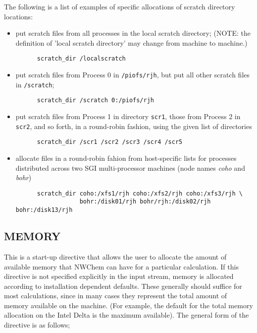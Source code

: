 The following is a list of examples of specific allocations of scratch
directory locations:
\begin{itemize}
\item put scratch files from all processes in the local scratch directory; 
(NOTE: the definition of 'local scratch directory' may change from 
machine to machine.)
\begin{verbatim}
      scratch_dir /localscratch
\end{verbatim}
\item put scratch files from Process 0 in \verb+/piofs/rjh+, but put all 
other scratch files in \verb+/scratch+;
\begin{verbatim}
      scratch_dir /scratch 0:/piofs/rjh
\end{verbatim}
\item put scratch files from Process 1 in directory \verb+scr1+, those from
Process 2 in \verb+scr2+, and so forth, in a round-robin fashion, using the
given list of directories
\begin{verbatim}
      scratch_dir /scr1 /scr2 /scr3 /scr4 /scr5
\end{verbatim}
\item allocate files in a round-robin fahion from
  host-specific lists for processes distributed across two
 SGI multi-processor machines (node names {\it coho} and {\it bohr})
\begin{verbatim}
      scratch_dir coho:/xfs1/rjh coho:/xfs2/rjh coho:/xfs3/rjh \
                  bohr:/disk01/rjh bohr/rjh:/disk02/rjh bohr:/disk13/rjh
\end{verbatim}
\end{itemize}

\subsection{MEMORY}


This is a start-up directive that allows the user to allocate the amount
of available memory that NWChem can have for a particular calculation.
If this directive is not specified explicitly in the input stream, memory
is allocated according to installation
dependent defaults.  These generally should suffice for most calculations,
since in many cases they represent the total amount of memory available on
the machine.  (For example, the default for the total memory allocation
on the Intel Delta is the maximum available).  The general form of the 
directive is as follows;


